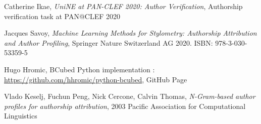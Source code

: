 \begin{thebibliography}{9}
Catherine Ikae,
\textit{UniNE at PAN-CLEF 2020: Author Verification},
Authorship verification task at PAN@CLEF 2020

Jacques Savoy,
\textit{Machine Learning Methods for Stylometry: Authorship Attribution and Author Profiling},
Springer Nature Switzerland AG 2020. ISBN: 978-3-030-53359-5

Hugo Hromic,
BCubed Python implementation : \url{https://github.com/hhromic/python-bcubed},
GitHub Page

Vlado Keselj, Fuchun Peng, Nick Cercone, Calvin Thomas,
\textit{N-Gram-based author profiles for authorship attribution},
2003 Pacific Association for Computational Linguistics

\end{thebibliography}
